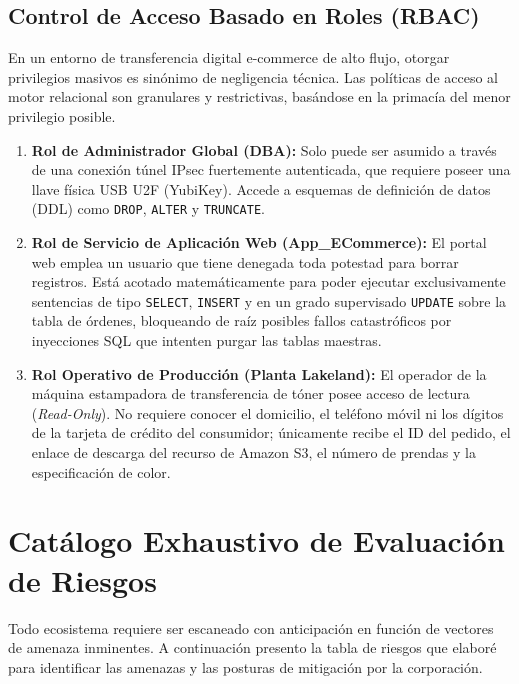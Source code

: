 \documentclass[11pt,a4paper]{article}
\begin{document}
\subsection{Control de Acceso Basado en Roles (RBAC)}
En un entorno de transferencia digital e-commerce de alto flujo, otorgar privilegios masivos es sinónimo de negligencia técnica. Las políticas de acceso al motor relacional son granulares y restrictivas, basándose en la primacía del menor privilegio posible.
\begin{enumerate}
    \item \textbf{Rol de Administrador Global (DBA):} Solo puede ser asumido a través de una conexión túnel IPsec fuertemente autenticada, que requiere poseer una llave física USB U2F (YubiKey). Accede a esquemas de definición de datos (DDL) como \texttt{DROP}, \texttt{ALTER} y \texttt{TRUNCATE}.
    \item \textbf{Rol de Servicio de Aplicación Web (App\_ECommerce):} El portal web emplea un usuario que tiene denegada toda potestad para borrar registros. Está acotado matemáticamente para poder ejecutar exclusivamente sentencias de tipo \texttt{SELECT}, \texttt{INSERT} y en un grado supervisado \texttt{UPDATE} sobre la tabla de órdenes, bloqueando de raíz posibles fallos catastróficos por inyecciones SQL que intenten purgar las tablas maestras.
    \item \textbf{Rol Operativo de Producción (Planta Lakeland):} El operador de la máquina estampadora de transferencia de tóner posee acceso de lectura (\textit{Read-Only}). No requiere conocer el domicilio, el teléfono móvil ni los dígitos de la tarjeta de crédito del consumidor; únicamente recibe el ID del pedido, el enlace de descarga del recurso de Amazon S3, el número de prendas y la especificación de color.
\end{enumerate}

\section{Catálogo Exhaustivo de Evaluación de Riesgos}

Todo ecosistema requiere ser escaneado con anticipación en función de vectores de amenaza inminentes. A continuación presento la tabla de riesgos que elaboré para identificar las amenazas y las posturas de mitigación por la corporación.
\end{document}
